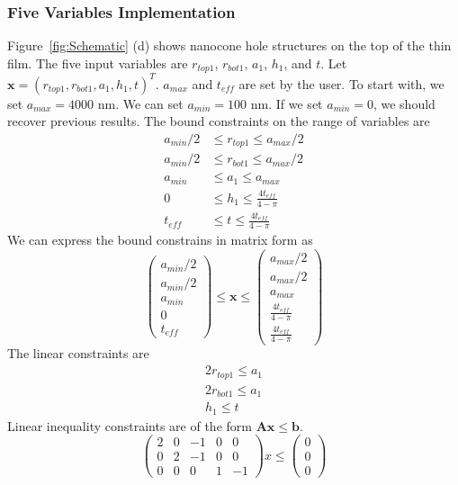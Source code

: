 \documentclass[12pt]{article}
\numberwithin{equation}{section}
\numberwithin{equation}{section}
\begin{document}
\subsubsection{Five Variables Implementation}
Figure~\ref{fig:Schematic} (d) shows nanocone hole structures on the top of the thin film.  
The five input variables are $r_{top1}$, $r_{bot1}$, $a_1$, $h_1$, and $t$.  
Let $\mathbf{x} = \left ( r_{top1}, r_{bot1}, a_1, h_1, t  \right )^T $.
$a_{max}$ and $t_{eff}$ are set by the user.  To start with, we set $a_{max} = 4000$ nm.
We can set $a_{min} = 100$ nm.  If we set $a_{min} = 0$, we should recover previous results.
The bound constraints on the range of variables are
\begin{align*}
a_{min}/2 & \leq r_{top1} \leq a_{max}/2 \\
a_{min}/2 & \leq r_{bot1} \leq a_{max}/2 \\
a_{min} & \leq a_{1} \leq a_{max} \\
0 & \leq h_1 \leq \frac {4t_{eff}}{4-\pi} \\
t_{eff}  & \leq t \leq \frac {4t_{eff}}{4-\pi}
\end{align*}
We can express the bound constrains in matrix form as
\begin{equation}
\left(
\begin{matrix}
a_{min}/2\\ 
a_{min}/2\\
a_{min}\\ 
0 \\
t_{eff} 
\end{matrix} \right )
\leq \mathbf{x}
 \leq 
 \left(
\begin{matrix}
a_{max}/2 \\ a_{max}/2 \\ a_{max}  \\ \frac {4t_{eff}}{4-\pi}\\ \frac {4t_{eff}}{4-\pi}
\end{matrix} \right )
\end{equation}
The linear constraints are 
\begin{align*}   
2r_{top1} \leq a_1 \\
2r_{bot1} \leq a_1 \\
h_{1} \leq t
\end{align*}
Linear inequality constraints are of the form $\mathbf{A} \mathbf{x} \leq \mathbf{b}$.
\begin{equation}
\left(
\begin{matrix}
2 & 0 & -1 & 0 & 0 \\
0 & 2 & -1 & 0 & 0 \\
0 & 0 & 0 & 1 & -1 
\end{matrix}
\right ) x  \leq \left ( \begin{matrix} 0\\ 0 \\0 \end{matrix} \right ) 
\end{equation}
\end{document}
